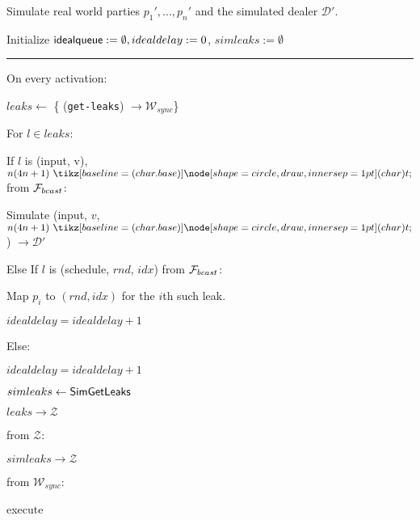 \begin{bbox}[title={Simulator $\mathcal{S}_{bracha} (\mathcal{D}, \mathcal{P}, \Delta)$}]

Simulate real world parties $p_1',...,p_n'$ and the simulated dealer $\mathcal{D}'$.

Initialize ${\mathsf {idealqueue}} := \emptyset, idealdelay := 0$, $simleaks := \emptyset$

\vspace{2mm} \hrule \vspace{2mm}

On every activation:
\begin{renumerate}
	\item $leaks \leftarrow$ \{ \Send (\texttt{get-leaks}) $\rightarrow \mathcal{W}_{sync}$\}
	
	\item For $l \in leaks$:
		\begin{renumerate}
		\item If $l$ is (input, v), $n(4n+1) \token$ from $\mathcal{F}_{bcast}$:

			\quad Simulate (input, $v$, $n(4n+1) \token$) $\rightarrow \mathcal{D}'$ 

		\item Else If $l$ is (schedule, $rnd$, $idx$) from $\mathcal{F}_{bcast}$:

			\quad Map $p_i$ to $(rnd,idx)$ for the $i$th such leak.

			\quad $idealdelay = idealdelay + 1$

		\item Else:

			\quad $idealdelay = idealdelay + 1$
		\end{renumerate}
	\item $simleaks \leftarrow {\mathsf {SimGetLeaks}}$

	\item \Send $leaks \rightarrow \mathcal{Z}$
	\end{renumerate}


\OnInput {} from $\mathcal{Z}$:
	\begin{renumerate}
	\item \Send $simleaks \rightarrow \mathcal{Z}$
	\end{renumerate}

\OnInput {} from $\mathcal{W}_{sync}$:
	\begin{renumerate}
	\item execute \msf{Poll}
	\end{renumerate}


\end{bbox}
